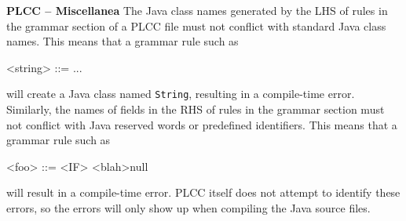 \begin{minipage}[t]{\sw}
\slidenumber
\LARGE
{\bf PLCC -- Miscellanea}\exx
The Java class names generated by the LHS of rules
in the grammar section of a PLCC file
must not conflict with standard Java class names.
This means that a grammar rule such as
\begin{qv}
<string> ::= ...
\end{qv}
will create a Java class named \verb'String',
resulting in a compile-time error.\exx
Similarly, the names of fields in the RHS of rules
in the grammar section must not conflict
with Java reserved words or predefined identifiers.
This means that a grammar rule such as
\begin{qv}
<foo> ::= <IF> <blah>null
\end{qv}
will result in a compile-time error.\exx
PLCC itself does not attempt to identify these errors,
so the errors will only show up
when compiling the Java source files.
\end{minipage}
\clearpage
